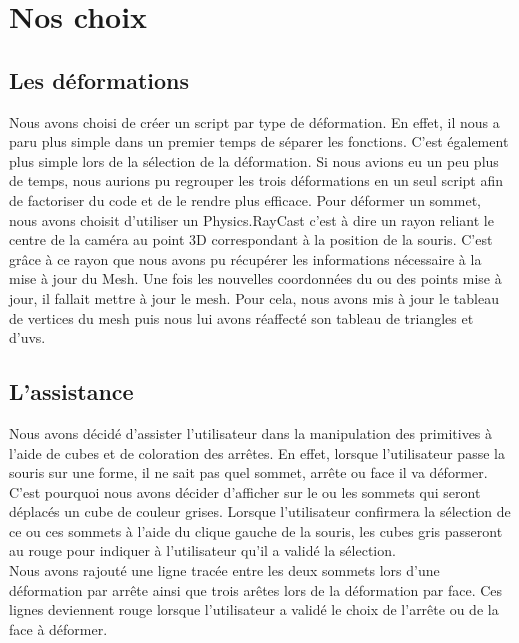 \documentclass[a4paper,oneside,12pt,titlepage]{article}
\begin{document}
\section{Nos choix}

\subsection{Les déformations}

Nous avons choisi de créer un script par type de déformation. En effet, il nous a paru plus simple dans un premier temps de séparer les fonctions. C'est également plus simple lors de la sélection de la déformation. Si nous avions eu un peu plus de temps, nous aurions pu regrouper les trois déformations en un seul script afin de factoriser du code et de le rendre plus efficace.
Pour déformer un sommet, nous avons choisit d'utiliser un Physics.RayCast c'est à dire un rayon reliant le centre de la caméra au point 3D correspondant à la position de la souris. C'est grâce à ce rayon que nous avons pu récupérer les informations nécessaire à la mise à jour du Mesh. Une fois les nouvelles coordonnées du ou des points mise à jour, il fallait mettre à jour le mesh. Pour cela, nous avons mis à jour le tableau de vertices du mesh puis nous lui avons réaffecté son tableau de triangles et d'uvs. 

\subsection{L'assistance}

Nous avons décidé d'assister l'utilisateur dans la manipulation des primitives à l'aide de cubes et de coloration des arrêtes. En effet, lorsque l'utilisateur passe la souris sur une forme, il ne sait pas quel sommet, arrête ou face il va déformer.\\ C'est pourquoi nous avons décider d'afficher sur le ou les sommets qui seront déplacés un cube de couleur grises. Lorsque l'utilisateur confirmera la sélection de ce ou ces sommets à l'aide du clique gauche de la souris, les cubes gris passeront au rouge pour indiquer à l'utilisateur qu'il a validé la sélection.\\
Nous avons rajouté une ligne tracée entre les deux sommets lors d'une déformation par arrête ainsi que trois arêtes lors de la déformation par face. Ces lignes deviennent rouge lorsque l'utilisateur a validé le choix de l'arrête ou de la face à déformer.
\end{document}
